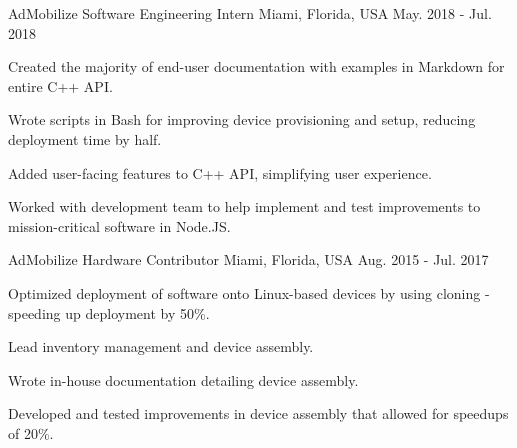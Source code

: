 \begin{cventries}
  \cventry
    {AdMobilize} %
    {Software Engineering Intern} %
    {Miami, Florida, USA} %
    {May. 2018 - Jul. 2018} %
    {
      \begin{cvitems} %
        \item {Created the majority of end-user documentation with examples in Markdown for entire C++ API.}
        \item {Wrote scripts in Bash for improving device provisioning and setup, reducing deployment time by half.}
        \item {Added user-facing features to C++ API, simplifying user experience.}
        \item {Worked with development team to help implement and test improvements to mission-critical software in Node.JS.}
      \end{cvitems}
    }

  \cventry
    {AdMobilize} %
    {Hardware Contributor} %
    {Miami, Florida, USA} %
    {Aug. 2015 - Jul. 2017} %
    {
      \begin{cvitems} %
        \item {Optimized deployment of software onto Linux-based devices by using cloning - speeding up deployment by 50\%.}
        \item {Lead inventory management and device assembly.}
        \item {Wrote in-house documentation detailing device assembly.}
        \item {Developed and tested improvements in device assembly that allowed for speedups of 20\%.}
      \end{cvitems}
    }

\end{cventries}
